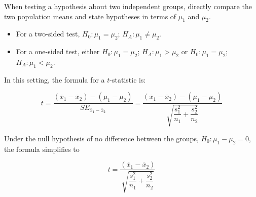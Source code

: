 \begin{termBox}{
When testing a hypothesis about two independent groups, directly compare the two population means and state hypotheses in terms of $\mu_1$ and $\mu_2$.
\begin{itemize}
	\item For a two-sided test, $H_0: \mu_{1} = \mu_{2}$; $H_A: \mu_{1} \neq \mu_{2}$.
	\item For a one-sided test, either $H_0: \mu_{1} = \mu_{2}$; $H_A: \mu_{1} > \mu_{2}$ or  $H_0: \mu_{1} = \mu_{2}$; $H_A: \mu_{1} < \mu_{2}$.
\end{itemize}
	}
\end{termBox}


In this setting, the formula for a $t$-statistic is:

\[t = \dfrac{(\overline{x}_1 - \overline{x}_2) - (\mu_1 - \mu_2)}{SE_{\overline{x}_{1} - \overline{x}_{2}}} = \dfrac{(\overline{x}_1 - \overline{x}_2) - (\mu_1 - \mu_2)}{\sqrt{\dfrac{s_{1}^{2}}{n_1} + \dfrac{s_{2}^{2}}{n_2}}} \]

Under the null hypothesis of no difference between the groups, $H_0: \mu_{1} - \mu_{2} = 0$, the formula simplifies to

\[t = \dfrac{(\overline{x}_1 - \overline{x}_2)}{\sqrt{\dfrac{s_{1}^{2}}{n_1} + \dfrac{s_{2}^{2}}{n_2}}}\]

